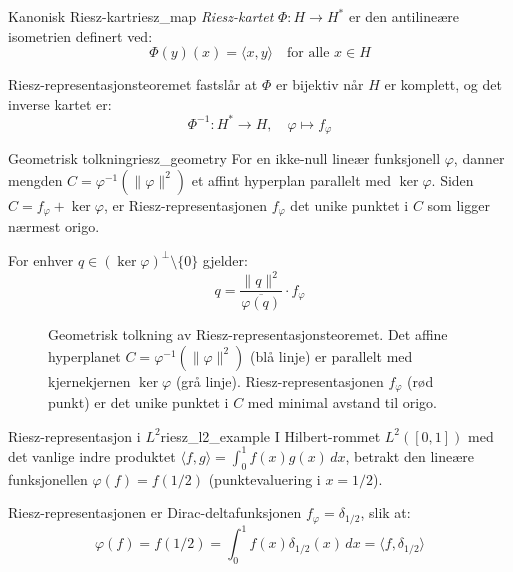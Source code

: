 \documentclass[../main.tex]{subfiles}
\begin{document}
\begin{definition}{Kanonisk Riesz-kart}{riesz_map}
	\emph{Riesz-kartet} $\Phi : H \to H^\ast$ er den antilineære isometrien definert ved:
	\begin{equation}
		\Phi(y)(x) = \langle x, y \rangle \quad \text{for alle } x \in H
	\end{equation}

	Riesz-representasjonsteoremet fastslår at $\Phi$ er bijektiv når $H$ er komplett, og det inverse kartet er:
	\begin{equation}
		\Phi^{-1} : H^\ast \to H, \quad \varphi \mapsto f_\varphi
	\end{equation}
\end{definition}

\begin{remark}{Geometrisk tolkning}{riesz_geometry}
	For en ikke-null lineær funksjonell $\varphi$, danner mengden $C = \varphi^{-1}(\|\varphi\|^2)$ et affint hyperplan parallelt med $\ker \varphi$. Siden $C = f_\varphi + \ker \varphi$, er Riesz-representasjonen $f_\varphi$ det unike punktet i $C$ som ligger nærmest origo.

	For enhver $q \in (\ker \varphi)^\perp \setminus \{0\}$ gjelder:
	\begin{equation}
		q = \frac{\|q\|^2}{\overline{\varphi(q)}} \cdot f_\varphi
	\end{equation}
\end{remark}

\begin{figure}[h]
	\centering
	
	\caption{Geometrisk tolkning av Riesz-representasjonsteoremet. Det affine hyperplanet $C = \varphi^{-1}(\|\varphi\|^2)$ (blå linje) er parallelt med kjernekjernen $\ker \varphi$ (grå linje). Riesz-representasjonen $f_\varphi$ (rød punkt) er det unike punktet i $C$ med minimal avstand til origo.}
	\label{fig:riesz_representation}
\end{figure}

\begin{example}{Riesz-representasjon i $L^2$}{riesz_l2_example}
	I Hilbert-rommet $L^2([0,1])$ med det vanlige indre produktet $\langle f, g \rangle = \int_0^1 f(x)g(x) \, dx$, betrakt den lineære funksjonellen $\varphi(f) = f(1/2)$ (punktevaluering i $x = 1/2$).

	Riesz-representasjonen er Dirac-deltafunksjonen $f_\varphi = \delta_{1/2}$, slik at:
	\begin{equation}
		\varphi(f) = f(1/2) = \int_0^1 f(x) \delta_{1/2}(x) \, dx = \langle f, \delta_{1/2} \rangle
	\end{equation}
\end{example}
\end{document}
